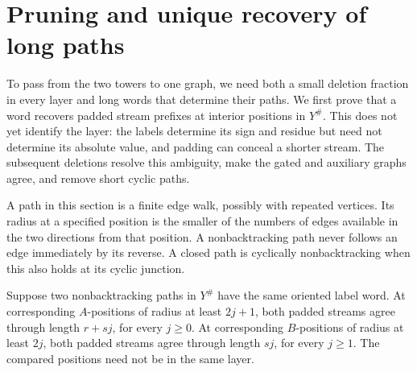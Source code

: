 \section{Pruning and unique recovery of long paths}
\label{prune:section}

To pass from the two towers to one graph, we need both a small deletion
fraction in every layer and long words that determine their paths.
We first prove that a word recovers padded stream prefixes at interior
positions in \(Y^\#\).  This does not yet identify the layer: the labels
determine its sign and residue but need not determine its absolute value,
and padding can conceal a shorter stream.  The subsequent deletions
resolve this ambiguity, make the gated and auxiliary graphs agree, and
remove short cyclic paths.

A path in this section is a finite edge walk,
possibly with repeated vertices.  Its radius at a specified position
is the smaller of the numbers of edges available in the two directions
from that position.  A nonbacktracking path never follows an edge
immediately by its reverse.  A closed path is cyclically
nonbacktracking when this also holds at its cyclic junction.

\begin{lemma}
\label{prune:prefix-recovery}
Suppose two nonbacktracking paths in \(Y^\#\) have the same oriented
label word.  At corresponding \(A\)-positions of radius at least
\(2j+1\), both padded streams agree through length \(r+sj\), for
every \(j\geq0\).  At corresponding \(B\)-positions of radius at
least \(2j\), both padded streams agree through length \(sj\), for
every \(j\geq1\).  The compared positions need not be in the same
layer.
\end{lemma}

